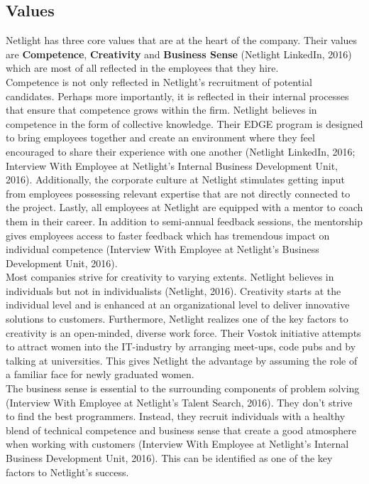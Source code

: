 \documentclass[12pt]{article}
\begin{document}
\subsection*{Values}
Netlight has three core values that are at the heart of the company. Their values are \textbf{Competence}, \textbf{Creativity} and \textbf{Business Sense} (Netlight LinkedIn, 2016) which are most of all reflected in the employees that they hire. \\
\newline
Competence is not only reflected in Netlight's recruitment of potential candidates. Perhaps more importantly, it is reflected in their internal processes that ensure that competence grows within the firm. Netlight believes in competence in the form of collective knowledge. Their EDGE program is designed to bring employees together and create an environment where they feel encouraged to share their experience with one another (Netlight LinkedIn, 2016; Interview With Employee at Netlight's Internal Business Development Unit, 2016). Additionally, the corporate culture at Netlight stimulates getting input from employees possessing relevant expertise that are not directly connected to the project. Lastly, all employees at Netlight are equipped with a mentor to coach them in their career. In addition to semi-annual feedback sessions, the mentorship gives employees access to faster feedback which has tremendous impact on individual competence (Interview With Employee at Netlight's Business Development Unit, 2016).\\
\newline
Most companies strive for creativity to varying extents. Netlight believes in individuals but not in individualists (Netlight, 2016). Creativity starts at the individual level and is enhanced at an organizational level to deliver innovative solutions to customers. Furthermore, Netlight realizes one of the key factors to creativity is an open-minded, diverse work force. Their Vostok initiative attempts to attract women into the IT-industry by arranging meet-ups, code pubs and by talking at universities. This gives Netlight the advantage by assuming the role of a familiar face for newly graduated women. \\
\newline
The business sense is essential to the surrounding components of problem solving (Interview With Employee at Netlight's Talent Search, 2016). They don't strive to find the best programmers. Instead, they recruit individuals with a healthy blend of technical competence and business sense that create a good atmosphere when working with customers (Interview With Employee at Netlight's Internal Business Development Unit, 2016). This can be identified as one of the key factors to Netlight's success.
\end{document}

